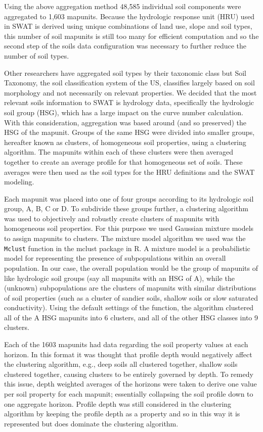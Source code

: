 Using the above aggregation method 48,585 individual soil components were
aggregated to 1,603 mapunits. Because the hydrologic response unit (HRU) used in
SWAT is derived using unique combinations of land use, slope and soil types,
this number of soil mapunits is still too many for efficient computation  and so
the second step of the soils data configuration was necessary to further reduce
the number of soil types. %

Other researchers have aggregated soil types by their taxonomic class
\citep{gatzke_aggregation_2011} but Soil Taxonomy, the soil classification
system of the US, classifies largely based on soil morphology and not
necessarily on relevant properties. We decided that the most relevant soils
information to SWAT is hydrology data, specifically the hydrologic soil group
(HSG), which has a large impact on the curve number calculation. With this
consideration, aggregation was based around (and so preserved) the HSG of the
mapunit. Groups of the same HSG were divided into smaller groups, hereafter
known as clusters, of homogeneous soil properties, using a clustering algorithm.
The mapunits within each of these clusters were then averaged together to create
an average profile for that homogeneous set of soils. These averages were then
used as the soil types for the HRU definitions and the SWAT modeling.

Each mapunit was placed into one of four groups according to its hydrologic soil
group, A, B, C or D. To subdivide these groups further, a clustering algorithm
was used to objectively and robustly create clusters of mapunits with
homogeneous soil properties. For this purpose we used Gaussian mixture models to
assign mapunits to clusters. The mixture model algorithm we used was the
\texttt{Mclust} function in the mclust package \citep{fraley_mclust_2012} in R.
A mixture model is a probabilistic model for representing the presence of
subpopulations within an overall population. In our case, the overall population
would be the group of mapunits of like hydrologic soil groups (say all mapunits
with an HSG of A), while the (unknown) subpopulations are the clusters of
mapunits with similar distributions of soil properties (such as a cluster of
sandier soils, shallow soils or slow saturated conductivity). Using the default
settings of the function, the algorithm clustered all of the A HSG mapunits into
6 clusters, and all of the other HSG classes into 9 clusters.

Each of the 1603 mapunits had data regarding the soil property values at each
horizon. In this format it was thought that profile depth would negatively
affect the clustering algorithm, e.g., deep soils all clustered together,
shallow soils clustered together, causing clusters to be entirely governed by
depth. To remedy this issue, depth weighted averages of the horizons were taken
to derive one value per soil property for each mapunit; essentially collapsing
the soil profile down to one aggregate horizon. Profile depth was still
considered in the clustering algorithm by keeping the profile depth as a
property and so in this way it is represented but does dominate the clustering
algorithm.


